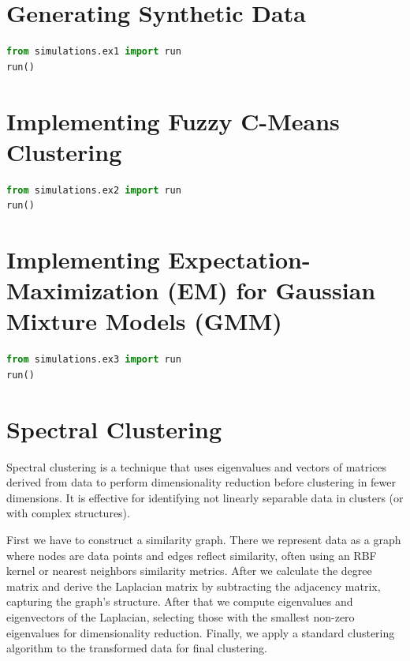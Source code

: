 \documentclass[11pt,a4paper]{article}
\begin{document}

\begin{abstract}
This paper explores various clustering methods in machine learning, starting with the generation of synthetic data and implementing models such as Fuzzy C-Means, Gaussian Mixture Models, and Spectral Clustering. It covers evaluating cluster quality, determining the optimal number of clusters, and understanding feature importance, concluding with insights on the German Credit Dataset.
\end{abstract}

\tableofcontents
\newpage

\section{Generating Synthetic Data}
\begin{lstlisting}[language=Python]
from simulations.ex1 import run
run()
\end{lstlisting}

\section{Implementing Fuzzy C-Means Clustering}
\begin{lstlisting}[language=Python]
from simulations.ex2 import run
run()
\end{lstlisting}

\section{Implementing Expectation-Maximization (EM) for Gaussian Mixture Models (GMM)}
\begin{lstlisting}[language=Python]
from simulations.ex3 import run
run()
\end{lstlisting}

\section{Spectral Clustering}
Spectral clustering is a technique that uses eigenvalues and vectors of matrices derived from data to perform dimensionality reduction before clustering in fewer dimensions. It is effective for identifying not linearly separable data in clusters (or with complex structures).

First we have to construct a similarity graph. There we represent data as a graph where nodes are data points and edges reflect similarity, often using an RBF kernel or nearest neighbors similarity metrics. After we calculate the degree matrix and derive the Laplacian matrix by subtracting the adjacency matrix, capturing the graph's structure. After that we compute eigenvalues and eigenvectors of the Laplacian, selecting those with the smallest non-zero eigenvalues for dimensionality reduction. Finally, we apply a standard clustering algorithm to the transformed data for final clustering.
\end{document}
